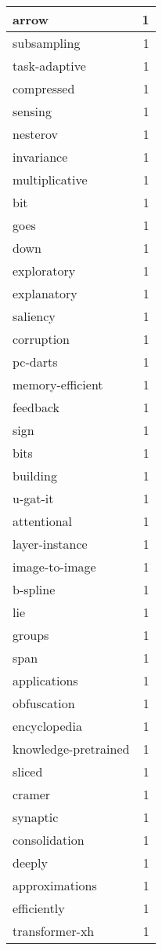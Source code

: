 \begin{table}[h]
\begin{tabular}{|l|r|}
arrow & 1 \\
\hline
subsampling & 1 \\
\hline
task-adaptive & 1 \\
\hline
compressed & 1 \\
\hline
sensing & 1 \\
\hline
nesterov & 1 \\
\hline
invariance & 1 \\
\hline
multiplicative & 1 \\
\hline
bit & 1 \\
\hline
goes & 1 \\
\hline
down & 1 \\
\hline
exploratory & 1 \\
\hline
explanatory & 1 \\
\hline
saliency & 1 \\
\hline
corruption & 1 \\
\hline
pc-darts & 1 \\
\hline
memory-efficient & 1 \\
\hline
feedback & 1 \\
\hline
sign & 1 \\
\hline
bits & 1 \\
\hline
building & 1 \\
\hline
u-gat-it & 1 \\
\hline
attentional & 1 \\
\hline
layer-instance & 1 \\
\hline
image-to-image & 1 \\
\hline
b-spline & 1 \\
\hline
lie & 1 \\
\hline
groups & 1 \\
\hline
span & 1 \\
\hline
applications & 1 \\
\hline
obfuscation & 1 \\
\hline
encyclopedia & 1 \\
\hline
knowledge-pretrained & 1 \\
\hline
sliced & 1 \\
\hline
cramer & 1 \\
\hline
synaptic & 1 \\
\hline
consolidation & 1 \\
\hline
deeply & 1 \\
\hline
approximations & 1 \\
\hline
efficiently & 1 \\
\hline
transformer-xh & 1 \\

\end{tabular}
\end{table}
